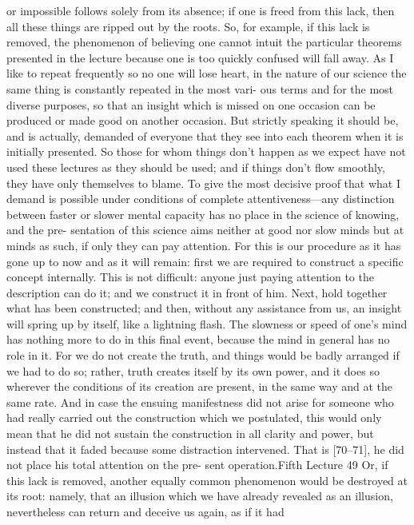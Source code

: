 or impossible follows solely from its absence; if one is freed from this lack,
then all these things are ripped out by the roots. So, for example, if this lack
is removed, the phenomenon of believing one cannot intuit the particular
theorems presented in the lecture because one is too quickly confused will
fall away. As I like to repeat frequently so no one will lose heart, in the
nature of our science the same thing is constantly repeated in the most vari-
ous terms and for the most diverse purposes, so that an insight which is
missed on one occasion can be produced or made good on another occasion.
But strictly speaking it should be, and is actually, demanded of everyone that
they see into each theorem when it is initially presented. So those for whom
things don’t happen as we expect have not used these lectures as they should
be used; and if things don’t flow smoothly, they have only themselves to
blame. To give the most decisive proof that what I demand is possible under
conditions of complete attentiveness—any distinction between faster or
slower mental capacity has no place in the science of knowing, and the pre-
sentation of this science aims neither at good nor slow minds but at minds
as such, if only they can pay attention. For this is our procedure as it has gone
up to now and as it will remain: first we are required to construct a specific
concept internally. This is not difficult: anyone just paying attention to the
description can do it; and we construct it in front of him. Next, hold together
what has been constructed; and then, without any assistance from us, an
insight will spring up by itself, like a lightning flash. The slowness or speed
of one’s mind has nothing more to do in this final event, because the mind
in general has no role in it. For we do not create the truth, and things would
be badly arranged if we had to do so; rather, truth creates itself by its own
power, and it does so wherever the conditions of its creation are present, in
the same way and at the same rate. And in case the ensuing manifestness did
not arise for someone who had really carried out the construction which we
postulated, this would only mean that he did not sustain the construction in
all clarity and power, but instead that it faded because some distraction
intervened. That is [70–71], he did not place his total attention on the pre-
sent operation.Fifth Lecture
49
Or, if this lack is removed, another equally common phenomenon
would be destroyed at its root: namely, that an illusion which we have already
revealed as an illusion, nevertheless can return and deceive us again, as if it had
